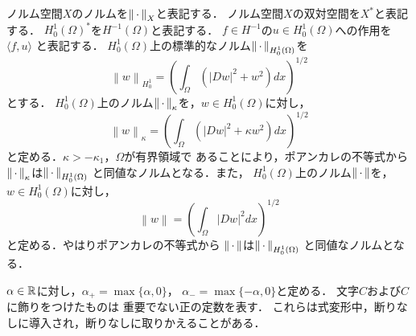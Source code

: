 ノルム空間$X$のノルムを$\left\|\, \cdot \, \right\|_X$と表記する．
ノルム空間$X$の双対空間を$X^*$と表記する．
$H_0^1(\Omega)^*$を$H^{-1}(\Omega)$と表記する．
$f \in H^{-1}$の$u \in H_0^1(\Omega)$への作用を$\langle f, u \rangle$
と表記する．
$H_0^1(\Omega)$上の標準的なノルム$\left\|\, \cdot \, \right\|_{H_0^1(\Omega)}$を
\[
 \left\| w \right\|_{H_0^1} = \left(\int_\Omega \left( \lvert Dw \rvert^2 +
  w ^2 \right) dx\right)^{1/2}
\]
とする．
$H_0^1(\Omega)$上のノルム$\left\|\, \cdot \, \right\|_{\kappa}$を，$w \in H_0^1(\Omega)$に対し，
\[
 \left\| w \right\|_\kappa = \left(\int_\Omega \left( \lvert Dw \rvert^2 +
 \kappa w ^2 \right) dx\right)^{1/2}
\]
と定める．$\kappa > -\kappa_1$，$\Omega$が有界領域で
あることにより，ポアンカレの不等式から
$\left\|\, \cdot \, \right\|_\kappa$は$\left\|\, \cdot \, \right\|_{H_0^1(\Omega)}$
と同値なノルムとなる．また，
$H_0^1(\Omega)$上のノルム$\left\|\, \cdot \, \right\|$を，$w \in H_0^1(\Omega)$に対し，
\[
 \left\| w \right\| = \left(\int_\Omega \lvert Dw \rvert^2 dx\right)^{1/2}
\]
と定める．やはりポアンカレの不等式から
$\left\|\, \cdot \, \right\|$は$\left\|\, \cdot \, \right\|_{H_0^1(\Omega)}$
と同値なノルムとなる．

$\alpha \in \mathbb{R}$に対し，$\alpha_+ = \max \{ \alpha, 0 \}$，
$\alpha_- = \max \{ -\alpha, 0 \}$と定める．
文字$C$および$C$に飾りをつけたものは
重要でない正の定数を表す．
これらは式変形中，断りなしに導入され，断りなしに取りかえることがある．

